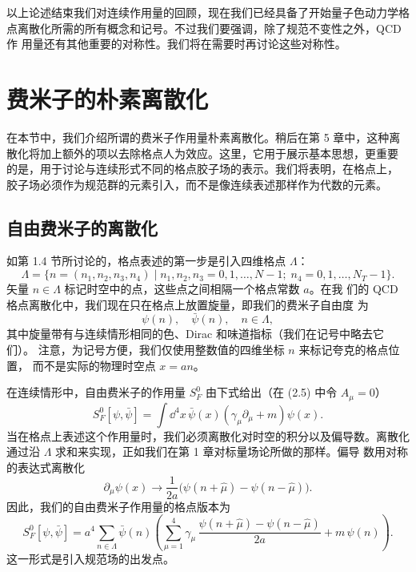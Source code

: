 以上论述结束我们对连续作用量的回顾，现在我们已经具备了开始量子色动力学格
点离散化所需的所有概念和记号。不过我们要强调，除了规范不变性之外，QCD 作
用量还有其他重要的对称性。我们将在需要时再讨论这些对称性。

\section{费米子的朴素离散化}

在本节中，我们介绍所谓的费米子作用量朴素离散化。稍后在第 5 章中，这种离
散化将加上额外的项以去除格点人为效应。这里，它用于展示基本思想，更重要
的是，用于讨论与连续形式不同的格点胶子场的表示。我们将表明，在格点上，
胶子场必须作为规范群的元素引入，而不是像连续表述那样作为代数的元素。

\subsection{自由费米子的离散化}

如第 1.4 节所讨论的，格点表述的第一步是引入四维格点 $\Lambda$：
\begin{equation}
  \Lambda = \{n = (n_1, n_2, n_3, n_4) \;|\;
    n_1, n_2, n_3 = 0, 1, \ldots, N-1 ; \;
    n_4 = 0, 1, \ldots, N_T-1\} .
\end{equation}
矢量 $n \in \Lambda$ 标记时空中的点，这些点之间相隔一个格点常数 $a$。在我
们的 QCD 格点离散化中，我们现在只在格点上放置旋量，即我们的费米子自由度
为
\begin{equation}
  \psi(n) , \quad \bar\psi(n) , \quad n \in \Lambda ,
\end{equation}
其中旋量带有与连续情形相同的色、Dirac 和味道指标（我们在记号中略去它们）。
注意，为记号方便，我们仅使用整数值的四维坐标 $n$ 来标记夸克的格点位置，
而不是实际的物理时空点 $x = an$。

在连续情形中，自由费米子的作用量 $S_F^0$ 由下式给出（在 (2.5) 中令
$A_\mu = 0$）
\begin{equation}
  S_F^0[\psi, \bar\psi] = \int \dd^4 x\,
    \bar\psi(x) (\gamma_\mu \partial_\mu + m) \psi(x) .
\end{equation}
当在格点上表述这个作用量时，我们必须离散化对时空的积分以及偏导数。离散化
通过沿 $\Lambda$ 求和来实现，正如我们在第 1 章对标量场论所做的那样。偏导
数用对称的表达式离散化
\begin{equation}
  \partial_\mu \psi(x) \to
    \frac{1}{2a}\big(\psi(n + \hat\mu) - \psi(n - \hat\mu)\big) .
\end{equation}
因此，我们的自由费米子作用量的格点版本为
\begin{equation}
  S_F^0[\psi, \bar\psi] = a^4 \sum_{n\in\Lambda}
    \bar\psi(n) \left( \sum_{\mu=1}^{4} \gamma_\mu\,
      \frac{\psi(n + \hat\mu) - \psi(n - \hat\mu)}{2a} + m\,\psi(n) \right) .
\end{equation}
这一形式是引入规范场的出发点。

